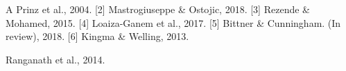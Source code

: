 \documentclass[12pt]{article}
\begin{document}
\noindent



\noindent [1] A Prinz et al., 2004. [2] Mastrogiuseppe \& Ostojic, 2018. [3] Rezende \& Mohamed, 2015. [4] Loaiza-Ganem et al., 2017. [5] Bittner \& Cunningham. (In review), 2018.  [6] Kingma \& Welling, 2013.

 \noindent [7] Ranganath et al., 2014.



\end{document}
